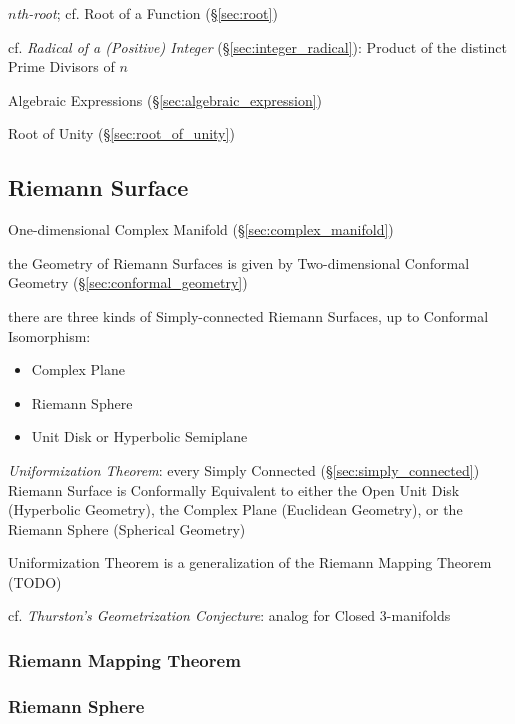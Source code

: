 \emph{$n$th-root}; cf. Root of a Function (\S\ref{sec:root})

cf. \emph{Radical of a (Positive) Integer} (\S\ref{sec:integer_radical}):
Product of the distinct Prime Divisors of $n$

Algebraic Expressions (\S\ref{sec:algebraic_expression})

Root of Unity (\S\ref{sec:root_of_unity})



\subsection{Riemann Surface}\label{sec:riemann_surface}

One-dimensional Complex Manifold (\S\ref{sec:complex_manifold})

the Geometry of Riemann Surfaces is given by Two-dimensional Conformal
Geometry (\S\ref{sec:conformal_geometry})

there are three kinds of Simply-connected Riemann Surfaces, up to Conformal
Isomorphism:
\begin{itemize}
  \item Complex Plane
  \item Riemann Sphere
  \item Unit Disk or Hyperbolic Semiplane
\end{itemize}

\emph{Uniformization Theorem}: every Simply Connected
(\S\ref{sec:simply_connected}) Riemann Surface is Conformally Equivalent to
either the Open Unit Disk (Hyperbolic Geometry), the Complex Plane (Euclidean
Geometry), or the Riemann Sphere (Spherical Geometry)

Uniformization Theorem is a generalization of the Riemann Mapping Theorem (TODO)

\fist cf. \emph{Thurston's Geometrization Conjecture}: analog for Closed
3-manifolds



\subsubsection{Riemann Mapping Theorem}
\label{sec:riemann_mapping_theorem}

\subsubsection{Riemann Sphere}\label{sec:riemann_sphere}

